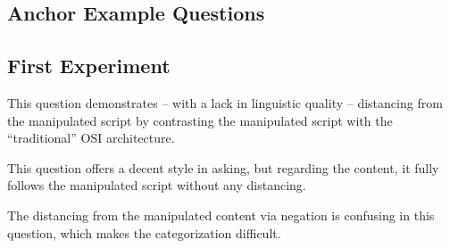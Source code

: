 \documentclass[twoside, 11pt]{article}
\begin{document}
\begin{appendices}


    


    \section{Anchor Example Questions}

    \subsection{First Experiment}

    This question demonstrates -- with a lack in linguistic quality -- distancing from the manipulated script by contrasting the manipulated script with the \enquote{traditional} OSI architecture.

    \vp

    This question offers a decent style in asking, but regarding the content, it fully follows the manipulated script without any distancing.

    \vp

    The distancing from the manipulated content via negation is confusing in this question, which makes the categorization difficult.


\end{appendices}
\end{document}
